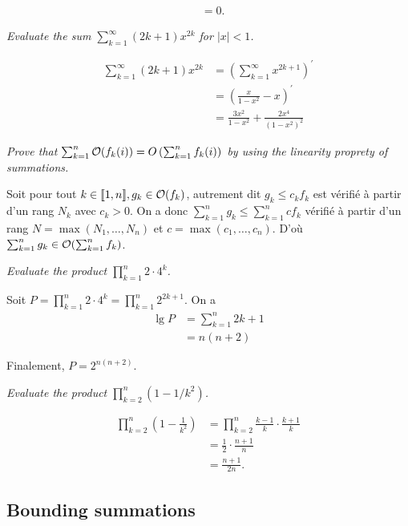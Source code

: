 \begin{description}
\begin{ex}
\begin{align*}
      &= 0.
     \end{align*}
   \end{ex}
 \item[A.1-5 $\star$] {\itshape Evaluate the sum $\sum_{k=1}^\infty(2k+1)x^{2k}$ for $|x| < 1$.}
   \begin{ex}
    \begin{align*}
      \sum_{k=1}^{\infty}(2k+1)x^{2k} &= \left(\sum_{k=1}^\infty x^{2k+1}\right)^\prime\\
    &= \left(\frac{x}{1-x^2} - x\right)^\prime\\
      &= \frac{3x^2}{1-x^2} + \frac{2x^4}{(1-x^2)^2}
    \end{align*}
  \end{ex}
   {\itshape  Prove that $\sum_{k=1}^n\mathcal{O}(f_k(i)) = O\left(\sum_{k=1}^n f_k(i)\right)$ by using the linearity proprety of summations.}
    \begin{ex}
    Soit pour tout $k \in \llbracket 1, n \rrbracket, g_k \in \mathcal{O}(f_k)$, autrement dit $g_k \le c_kf_k$ est v\'erifi\'e \`a partir d'un rang $N_k$ avec $c_k > 0$. On a donc $\sum_{k=1}^n g_k \le \sum_{k=1}^ncf_k$ v\'erifi\'e \`a partir d'un rang $N = \max(N_1, \ldots,N_n)$ et $c = \max(c_1, \ldots,c_n)$. D'o\`u $\sum_{k=1}^n g_k \in \mathcal{O}(\sum_{k=1}^n f_k)$.
  \end{ex}
 {\itshape Evaluate the product $\prod_{k=1}^n2\cdot 4^k$.}
    \begin{ex}
  Soit $P=\prod_{k=1}^n2\cdot4^k = \prod_{k=1}^n2^{2k+1}$. On a 
  \begin{align*}
    \lg P &= \sum_{k=1}^n2k+1\\
    &= n(n+2)
  \end{align*}

  Finalement, $P = 2^{n(n+2)}$.
    \end{ex}
  \item[A.1-8 $\star$] {\itshape Evaluate the product $\prod_{k=2}^n(1-1/k^2)$.}
    \begin{ex}
  \begin{align*}
    \prod_{k=2}^n(1-\frac{1}{k^2}) &= \prod_{k=2}^n \frac{k-1}{k}\cdot\frac{k+1}{k}\\
      &= \frac{1}{2}\cdot\frac{n+1}{n}\\
      &= \frac{n+1}{2n}.
  \end{align*}
    \end{ex}
\end{description}

  \subsection{Bounding summations}

